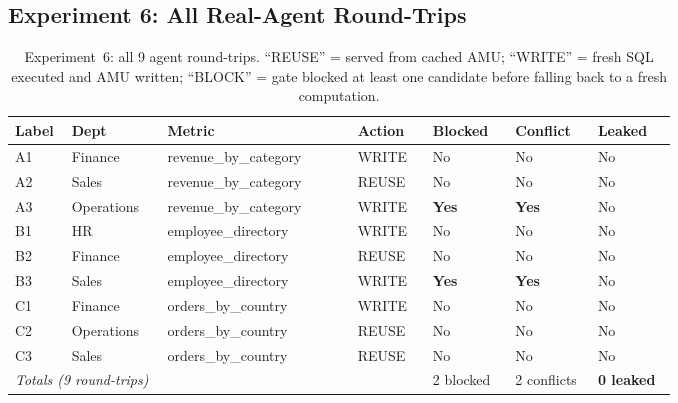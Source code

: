 \documentclass[9pt,twocolumn,twoside]{extarticle}
\begin{document}
\subsection{Experiment 6: All Real-Agent Round-Trips}
\begin{table}[h]
\centering
\caption{Experiment~6: all 9 agent round-trips. ``REUSE'' = served from
         cached AMU; ``WRITE'' = fresh SQL executed and AMU written;
         ``BLOCK'' = gate blocked at least one candidate before
         falling back to a fresh computation.}
\label{tab:exp6}
\small
\begin{tabular}{@{}p{0.03\linewidth}p{0.11\linewidth}p{0.24\linewidth}p{0.09\linewidth}p{0.1\linewidth}p{0.1\linewidth}p{0.1\linewidth}@{}}
\toprule
Label & Dept & Metric & Action & Blocked & Conflict & Leaked \\
\midrule
A1 & Finance    & revenue\_by\_category & WRITE & No & No & No \\
A2 & Sales      & revenue\_by\_category & REUSE & No & No & No \\
A3 & Operations & revenue\_by\_category & WRITE & \textbf{Yes} & \textbf{Yes} & No \\
B1 & HR         & employee\_directory   & WRITE & No & No & No \\
B2 & Finance    & employee\_directory   & REUSE & No & No & No \\
B3 & Sales      & employee\_directory   & WRITE & \textbf{Yes} & \textbf{Yes} & No \\
C1 & Finance    & orders\_by\_country   & WRITE & No & No & No \\
C2 & Operations & orders\_by\_country   & REUSE & No & No & No \\
C3 & Sales      & orders\_by\_country   & REUSE & No & No & No \\
\midrule
\multicolumn{4}{l}{\textit{Totals (9 round-trips)}} &
  2 blocked & 2 conflicts & \textbf{0 leaked} \\
\bottomrule
\end{tabular}
\end{table}

\balance


\end{document}

